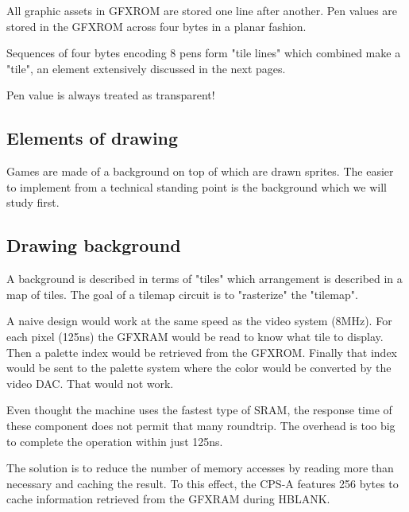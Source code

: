 
All graphic assets in GFXROM are stored one line after another. Pen values are stored in the GFXROM across four bytes in a planar fashion.






Sequences of four bytes encoding 8 pens form "tile lines" which combined make a "tile", an element extensively discussed in the next pages.

 \begin{trivia}
 Pen value  is always treated as transparent!
 \end{trivia}



\subsection{Elements of drawing}

Games are made of a background on top of which are drawn sprites. The easier to implement from a technical standing point is the background which we will study first.

\subsection{Drawing background}

A background is described in terms of "tiles" which arrangement is described in a map of tiles. The goal of a tilemap circuit is to "rasterize" the "tilemap".

A naive design would work at the same speed as the video system (8MHz). For each pixel (125ns) the GFXRAM would be read to know what tile to display. Then a palette index would be retrieved from the GFXROM. Finally that index would be sent to the palette system where the color would be converted by the video DAC. That would not work.

Even thought the machine uses the fastest type of SRAM, the response time of these component does not permit that many roundtrip. The overhead is too big to complete the operation within just 125ns.

The solution is to reduce the number of memory accesses by reading more than necessary and caching the result. To this effect, the CPS-A features 256 bytes to cache information retrieved from the GFXRAM during HBLANK.

